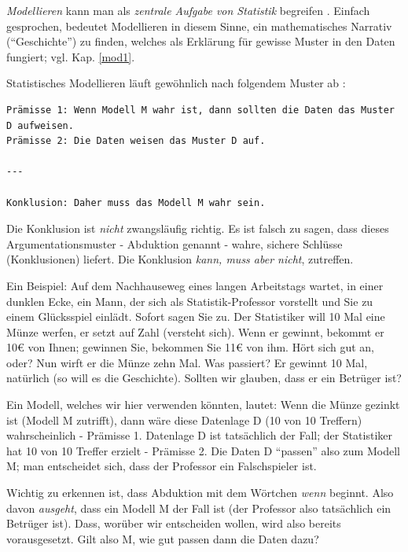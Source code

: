 \documentclass[12pt,ngerman,]{book}
\newcommand{\euro}{€}
\begin{document}
\emph{Modellieren} kann man als \emph{zentrale Aufgabe von Statistik}
begreifen \citep{cobb2007introductory, grolemund2014cognitive}. Einfach
gesprochen, bedeutet Modellieren in diesem Sinne, ein mathematisches
Narrativ (``Geschichte'') zu finden, welches als Erklärung für gewisse
Muster in den Daten fungiert; vgl. Kap. \ref{mod1}.

Statistisches Modellieren läuft gewöhnlich nach folgendem Muster ab
\citep{grolemund2014cognitive}:

\begin{verbatim}
Prämisse 1: Wenn Modell M wahr ist, dann sollten die Daten das Muster D aufweisen.
Prämisse 2: Die Daten weisen das Muster D auf.

---

Konklusion: Daher muss das Modell M wahr sein.
\end{verbatim}

Die Konklusion ist \emph{nicht} zwangsläufig richtig. Es ist falsch zu
sagen, dass dieses Argumentationsmuster - Abduktion
\citep{peirce1955abduction} genannt - wahre, sichere Schlüsse
(Konklusionen) liefert. Die Konklusion \emph{kann, muss aber nicht},
zutreffen.

Ein Beispiel: Auf dem Nachhauseweg eines langen Arbeitstags wartet, in
einer dunklen Ecke, ein Mann, der sich als Statistik-Professor vorstellt
und Sie zu einem Glücksspiel einlädt. Sofort sagen Sie zu. Der
Statistiker will 10 Mal eine Münze werfen, er setzt auf Zahl (versteht
sich). Wenn er gewinnt, bekommt er 10\euro{} von Ihnen; gewinnen Sie,
bekommen Sie 11\euro{} von ihm. Hört sich gut an, oder? Nun wirft er die
Münze zehn Mal. Was passiert? Er gewinnt 10 Mal, natürlich (so will es
die Geschichte). Sollten wir glauben, dass er ein Betrüger ist?

Ein Modell, welches wir hier verwenden könnten, lautet: Wenn die Münze
gezinkt ist (Modell M zutrifft), dann wäre diese Datenlage D (10 von 10
Treffern) wahrscheinlich - Prämisse 1. Datenlage D ist tatsächlich der
Fall; der Statistiker hat 10 von 10 Treffer erzielt - Prämisse 2. Die
Daten D ``passen'' also zum Modell M; man entscheidet sich, dass der
Professor ein Falschspieler ist.

Wichtig zu erkennen ist, dass Abduktion mit dem Wörtchen \emph{wenn}
beginnt. Also davon \emph{ausgeht}, dass ein Modell M der Fall ist (der
Professor also tatsächlich ein Betrüger ist). Dass, worüber wir
entscheiden wollen, wird also bereits vorausgesetzt. Gilt also M, wie
gut passen dann die Daten dazu?
\end{document}
